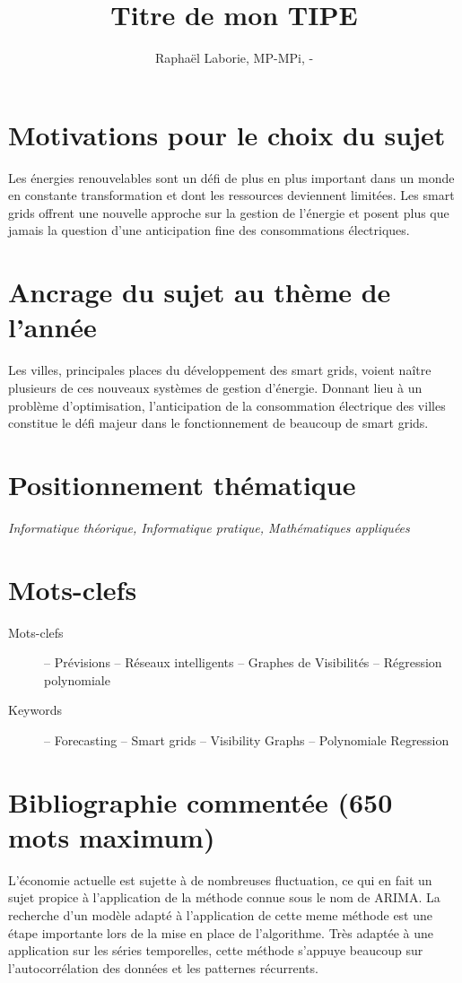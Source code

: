 \documentclass[12pt,a4paper]{article}
\title{Titre de mon TIPE}
\author{Raphaël Laborie, MP\oldstylenums{1}-MPi, \oldstylenums{\the\year}-\oldstylenums{\arabic{nextyear}} }
\newcommand{\positionnementThematique}[1]{
\section*{Positionnement thématique}
{\it #1}}
\newcommand{\motclefs}[2]{
    \section*{Mots-clefs}
        \begin{description}
            \item[Mots-clefs] -- #1 
            \item[Keywords]   -- #2
        \end{description}
}
\begin{document}
\maketitle
\section*{Motivations pour le choix du sujet}
Les énergies renouvelables sont un défi de plus en plus important dans un monde en constante transformation et dont les ressources deviennent limitées.
Les smart grids offrent une nouvelle approche sur la gestion de l'énergie et posent plus que jamais la question d'une anticipation fine des consommations électriques.
\section*{Ancrage du sujet au thème de l'année}
Les villes, principales places du développement des smart grids, voient naître plusieurs de ces nouveaux systèmes de gestion d'énergie. Donnant lieu à un problème d'optimisation, l'anticipation de la consommation électrique des villes constitue le défi majeur dans le fonctionnement de beaucoup de smart grids.
\positionnementThematique{Informatique théorique, Informatique pratique, Mathématiques appliquées}
\motclefs{Prévisions -- Réseaux intelligents -- Graphes de Visibilités -- Régression polynomiale}{Forecasting -- Smart grids -- Visibility Graphs -- Polynomiale Regression}
\section*{Bibliographie commentée (650 mots maximum)}

L'économie actuelle est sujette à de nombreuses fluctuation, ce qui en fait un sujet propice à l'application de la méthode connue sous le nom de ARIMA. La recherche d'un modèle adapté \cite{hughchristensen} à l'application de cette meme méthode \cite{economyarima} est une étape importante lors de la mise en place de l'algorithme. Très adaptée à une application sur les séries temporelles, cette méthode s'appuye beaucoup sur l'autocorrélation des données et les patternes récurrents.
\end{document}
